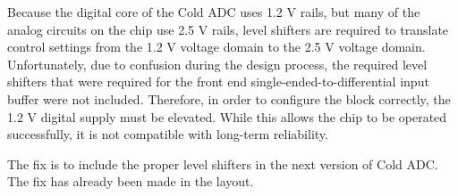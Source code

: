 \label{sec:5.2}


Because the digital core of the Cold ADC uses 1.2 V rails, but many of the analog circuits on the chip use 2.5 V rails, level shifters are required to translate control settings from the 1.2 V voltage domain to the 2.5 V voltage domain. Unfortunately, due to confusion during the design process, the required level shifters that were required for the front end single-ended-to-differential input buffer were not included. Therefore, in order to configure the block correctly, the 1.2 V digital supply must be elevated. While this allows the chip to be operated successfully, it is not compatible with long-term reliability.

The fix is to include the proper level shifters in the next version of Cold ADC. The fix has already been made in the layout.


